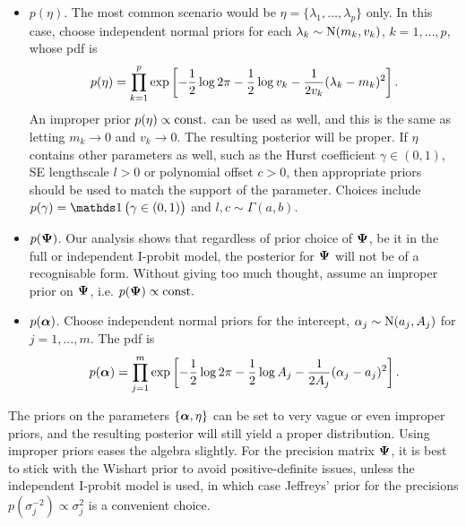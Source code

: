 \begin{itemize}
  \item {\boldmath$p(\eta)$}. The most common scenario would be $\eta = \{\lambda_1,\dots,\lambda_p\}$ only. In this case, choose independent normal priors for each $\lambda_k \sim \operatorname{N}(m_k,v_k)$, $k=1,\dots,p$, whose pdf is
  \begin{align*}
    p(\eta) = \prod_{k=1}^p \exp\left[-\frac{1}{2}\log 2\pi - \frac{1}{2}\log v_k - \frac{1}{2v_k} (\lambda_k - m_k)^2 \right].
  \end{align*} 
  An improper prior $p(\eta) \propto \text{const.}\hspace{0.01em}$ can be used as well, and this is the same as letting $m_k \to 0$ and $v_k\to 0$.
  The resulting posterior will be proper.
  If $\eta$ contains other parameters as well, such as the Hurst coefficient $\gamma \in (0,1)$, SE lengthscale $l >0$ or polynomial offset $c>0$, then appropriate priors should be used to match the support of the parameter.
  Choices include $p(\gamma) = \ind\big(\gamma \in (0,1)\big)$ and $l,c \sim \Gamma(a,b)$.
  
  \item {\boldmath$p({\bm\Psi})$}. Our analysis shows that regardless of prior choice of ${\bm\Psi}$, be it in the full or independent I-probit model, the posterior for ${\bm\Psi}$ will not be of a recognisable form. Without giving too much thought, assume an improper prior on ${\bm\Psi}$, i.e. $p({\bm\Psi}) \propto \text{const.}\hspace{0.01em}$
  
  \item {\boldmath$p({\bm\alpha})$}. Choose independent normal priors for the intercept, $\alpha_j \sim \operatorname{N}(a_j,A_j)$ for $j=1,\dots,m$. The pdf is
  \[
    p({\bm\alpha}) = \prod_{j=1}^m \exp\left[
    -\frac{1}{2}\log 2\pi - \frac{1}{2}\log A_j - \frac{1}{2A_j} (\alpha_j - a_j)^2  
    \right].
  \]
\end{itemize}

\begin{remark}
  The priors on the parameters $\{ {\bm\alpha},\eta \}$ can be set to very vague or even improper priors, and the resulting posterior will still yield a proper distribution.
  Using improper priors eases the algebra slightly.
  For the precision matrix ${\bm\Psi}$, it is best to stick with the Wishart prior to avoid positive-definite issues, unless the independent I-probit model is used, in which case Jeffreys' prior for the precisions $p(\sigma_j^{-2})\propto \sigma_j^2$ is a convenient choice.
\end{remark}

